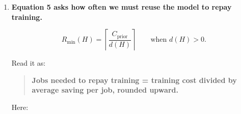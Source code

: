 \documentclass[11pt,a4paper]{article}
\begin{document}
\begin{enumerate}
  First, the paper defines:

  \[
  \Delta T=\bar T(a_m)-\bar T(a_F).
  \]

  The bar means \textbf{average}, rather than median.

  \(\Delta T\) is the average extra time our chosen scheduler needs per useful execution.

  If that extra time is positive, the crossover is:

  \[
  H^*=\frac{S_F-S_m}{\Delta T}.
  \]

  Read it as:

  \begin{quote}
  \textbf{Number of executions before the saving disappears = upfront saving divided by extra cost per execution.}
  \end{quote}

  Using the previous example:

  \[
  H^*=\frac{70\text{ ms}}{0.1\text{ ms per execution}}
  =700\text{ executions}.
  \]

  Before 700, the shortcut wins. At 700, the simplified calculation ties. After 700, full search's faster chosen scheduler repays its more expensive search.

  This assumes the average execution times stay stable.

  In the measured study, some runs produced an estimated crossover around \textbf{935 useful executions}, as the median among the runs where such a crossover existed.

  \textbf{935 is not a universal cutoff.} Only 64 of 120 Guided 4 comparisons had both an upfront saving and a positive later execution penalty.

  If our chosen scheduler is equally fast or faster in the measurements, this equation gives no future point where full search catches up under those assumptions.
\item
  \textbf{Equation 5 asks how often we must reuse the model to repay training.}

  \[
  R_{\min}(H)
  =
  \left\lceil
  \frac{C_{\mathrm{prior}}}{d(H)}
  \right\rceil
  \qquad\text{when }d(H)>0.
  \]

  Read it as:

  \begin{quote}
  \textbf{Jobs needed to repay training = training cost divided by average saving per job, rounded upward.}
  \end{quote}

  Here:


\end{enumerate}
\end{document}
